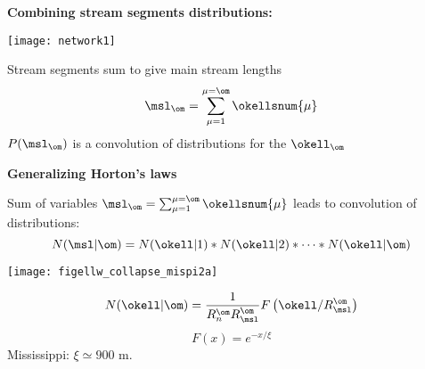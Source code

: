 \begin{frame}[label=]
\begin{frame}[label=]
\begin{frame}[label=]
\begin{frame}[label=]
\begin{frame}[label=]
\begin{frame}[label=]
\begin{frame}[label=]
\begin{frame}[label=]
\begin{frame}[label=]
\begin{frame}[label=]
\begin{frame}[label=]
\begin{frame}[label=]
\begin{frame}[label=]
\begin{frame}[label=]
\begin{frame}[label=]
\begin{frame}[label=]
\begin{frame}[label=]
\begin{frame}[label=]
\begin{frame}[label=]
\begin{frame}[label=]
\begin{frame}[label=]
\begin{frame}[label=]
\begin{frame}[label=]
\begin{frame}[label=]
\begin{frame}[label=]
\begin{frame}[label=]
\begin{frame}[label=]
\begin{frame}[label=]
\begin{frame}[label=]
\begin{frame}[label=]
\begin{frame}[label=]
\begin{frame}[label=]
\begin{frame}[label=]
\begin{frame}[label=]
\begin{frame}[label=]
\begin{frame}[label=]
\begin{frame}[label=]
\begin{frame}[label=]
\begin{frame}[label=]
\begin{frame}[label=]
\begin{frame}[label=]
\begin{frame}[label=]
\begin{frame}[label=]
\begin{frame}[label=]
\begin{frame}[label=]
\begin{frame}[label=]
  \textbf{Combining stream segments distributions:}

      
    \texttt{[image: network1]}
    
    
     Stream segments sum to give main stream lengths
     $$ \msl_\om = \sum_{\mu=1}^{\mu=\om} \okellsnum{\mu} $$
     $P(\msl_\om)$ is a convolution of distributions
      for the $\okell_\om$
    
    
  



\begin{frame}[label=]
  \textbf{Generalizing Horton's laws}

  
   Sum of variables 
  $ \msl_\om = \sum_{\mu=1}^{\mu=\om} \okellsnum{\mu} $
  leads to convolution of distributions:
  $$N(\msl|\om) = N(\okell|1) \ast N(\okell|2) \ast\cdots\ast N(\okell|\om)$$
  
  {
          
      \texttt{[image: figellw\_collapse\_mispi2a]}
      
      $$N(\okell|\om) = \frac{1}{R_n^{\om}R_\msl^{\om}}
      F\left(  \okell / R_\msl^\om  \right) $$
      $$ F(x) = e^{-x/\xi} $$
      Mississippi: $\xi \simeq 900$ m.
      }




\end{frame}
\end{frame}
\end{frame}
\end{frame}
\end{frame}
\end{frame}
\end{frame}
\end{frame}
\end{frame}
\end{frame}
\end{frame}
\end{frame}
\end{frame}
\end{frame}
\end{frame}
\end{frame}
\end{frame}
\end{frame}
\end{frame}
\end{frame}
\end{frame}
\end{frame}
\end{frame}
\end{frame}
\end{frame}
\end{frame}
\end{frame}
\end{frame}
\end{frame}
\end{frame}
\end{frame}
\end{frame}
\end{frame}
\end{frame}
\end{frame}
\end{frame}
\end{frame}
\end{frame}
\end{frame}
\end{frame}
\end{frame}
\end{frame}
\end{frame}
\end{frame}
\end{frame}
\end{frame}
\end{frame}
